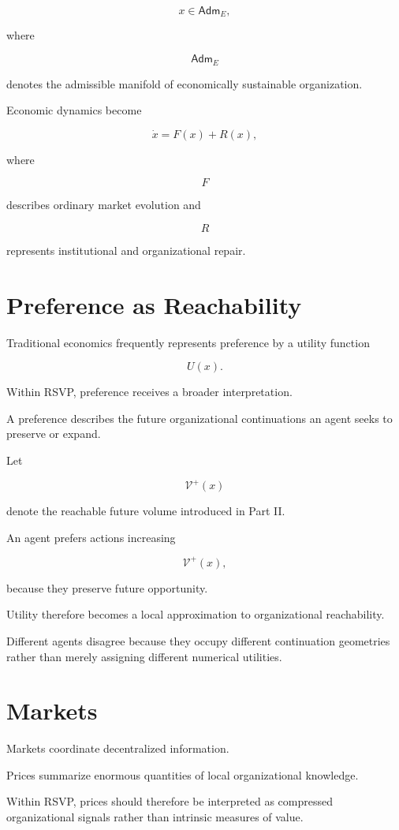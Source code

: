 \documentclass[11pt,oneside]{book}
\numberwithin{equation}{chapter}
\theoremstyle{definition}
\theoremstyle{plain}
\newcommand{\Adm}{\mathsf{Adm}}
\begin{document}
\[
x
\in
\Adm_E,
\]

where

\[
\Adm_E
\]

denotes the admissible manifold of economically sustainable organization.

Economic dynamics become

\[
\dot x
=
F(x)
+
R(x),
\]

where

\[
F
\]

describes ordinary market evolution and

\[
R
\]

represents institutional and organizational repair.

\section{Preference as Reachability}

Traditional economics frequently represents preference by a utility
function

\[
U(x).
\]

Within RSVP, preference receives a broader interpretation.

A preference describes the future organizational continuations an agent
seeks to preserve or expand.

Let

\[
\mathcal V^+(x)
\]

denote the reachable future volume introduced in Part II.

An agent prefers actions increasing

\[
\mathcal V^+(x),
\]

because they preserve future opportunity.

Utility therefore becomes a local approximation to organizational
reachability.

Different agents disagree because they occupy different continuation
geometries rather than merely assigning different numerical utilities.

\section{Markets}

Markets coordinate decentralized information.

Prices summarize enormous quantities of local organizational knowledge.

Within RSVP, prices should therefore be interpreted as compressed
organizational signals rather than intrinsic measures of value.
\end{document}

